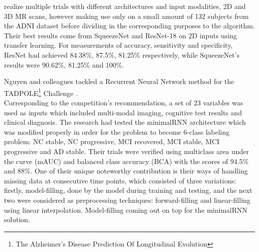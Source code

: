 \documentclass[a4paper, 12pt]{article}
\begin{document}
\cite{10.1117/1.JMI.8.2.024503} realize multiple trials with different architectures and input modalities, 2D and 3D MR scans,
however making use only on a small amount of 132 subjects from the ADNI dataset before dividing in the corresponding purposes
to the algorithm. Their best results come from SqueezeNet and ResNet-18 on 2D inputs using transfer learning.
For measurements of accuracy, sensitivity and specificity, ResNet had achieved 84.38\%, 87.5\%, 81.25\% respectively, while
SqueezeNet's results were 90.62\%, 81.25\% and 100\%.


Nguyen and colleagues tackled a Recurrent Neural Network method for the TADPOLE\footnote{The Alzheimer's Disease Prediction
    Of Longitudinal Evolution} Challenge \cite{NGUYEN2020117203}. \\
Corresponding to the competition's recommendation, a set of 23 variables was used as inputs which included multi-modal
imaging, cognitive test results and clinical diagnosis. The research had tested the minimalRNN architecture \cite{Chen2017MinimalRNNTM}
which was modified properly in order for the problem to become 6-class labeling problem: NC stable, NC progressive, MCI recovered,
MCI stable, MCI progressive and AD stable. Their trials were verified using multiclass area under the curve (mAUC) and balanced
class accuracy (BCA) with the scores of 94.5\% and 88\%. One of their unique noteworthy contribution is their ways of
handling missing data at consecutive time points, which consisted of three variations: firstly, model-filling, done by the model
during training and testing, and the next two were considered as preprocessing techniques: forward-filling and linear-filling using linear
interpolation. Model-filling coming out on top for the minimalRNN solution.

\newpage



\end{document}
